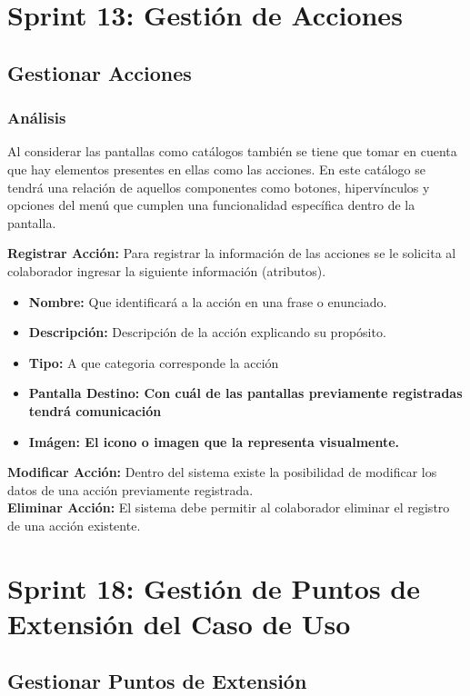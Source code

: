 \section{Sprint 13: Gestión de Acciones}

\subsection{Gestionar Acciones}
\subsubsection {Análisis}
Al considerar las pantallas como catálogos también se tiene que tomar en cuenta que hay elementos presentes en ellas como las acciones. En este catálogo se tendrá una relación de aquellos componentes como botones, hipervínculos y opciones del menú que cumplen una funcionalidad específica dentro de la pantalla.

\textbf {Registrar Acción:}
Para registrar la información de las acciones se le solicita al colaborador ingresar la siguiente información (atributos).
\begin{itemize}
	
	\item \textbf{Nombre:} Que identificará a la acción en una frase o enunciado.
	\item \textbf{Descripción:} Descripción de la acción explicando su propósito.
	\item \textbf{Tipo:} A que categoria corresponde la acción
	\item \textbf{Pantalla Destino: Con cuál de las pantallas previamente registradas tendrá comunicación}
	\item \textbf{Imágen: El icono o imagen que la representa visualmente.}
\end{itemize}

\textbf {Modificar Acción:}
Dentro del sistema existe la posibilidad de modificar los datos de una acción previamente registrada.\\

\textbf {Eliminar Acción:} 
El sistema debe permitir al colaborador eliminar el registro de una acción existente.\\

\section{Sprint 18: Gestión de Puntos de Extensión del Caso de Uso}
\subsection{Gestionar Puntos de Extensión}
